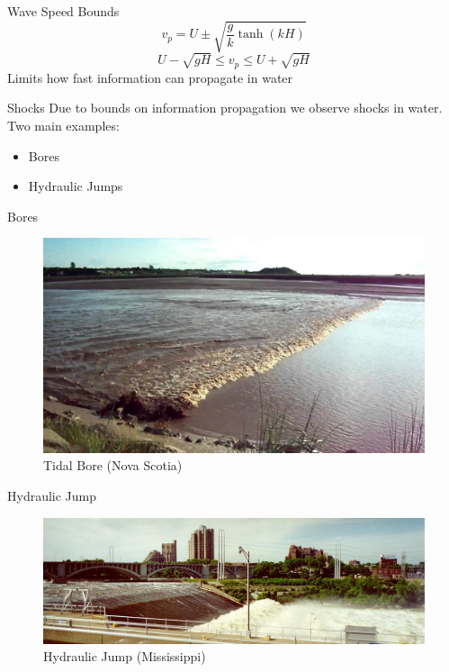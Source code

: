 \documentclass[handout]{beamer}
\begin{document}
\begin{frame}{Wave Speed Bounds}
	\begin{equation*}
	v_p = U \pm\sqrt{\frac{g}{k} \tanh\left(kH\right)}
	\end{equation*}	
	\begin{equation*}
	 U - \sqrt{gH} \le v_p \le U +  \sqrt{{g}H}
	\end{equation*}
	\pause
	Limits how fast information can propagate in water	
\end{frame}

\begin{frame}{Shocks}
	Due to bounds on information propagation we observe shocks in water.
	\newline
	Two main examples:
	\begin{itemize}
		\item Bores
		\item Hydraulic Jumps
	\end{itemize}
\end{frame}

\begin{frame}{Bores}
\begin{figure}
	\includegraphics[width=\textwidth]{./Figures/TidalBores.jpg}
	\caption{Tidal Bore (Nova Scotia)}
\end{figure}
\end{frame}

\begin{frame}{Hydraulic Jump}
	\begin{figure}
		\includegraphics[width=\textwidth]{./Figures/HydrualicJump1.jpg}
		\caption{Hydraulic Jump (Mississippi)}
	\end{figure}
\end{frame}
\end{document}
